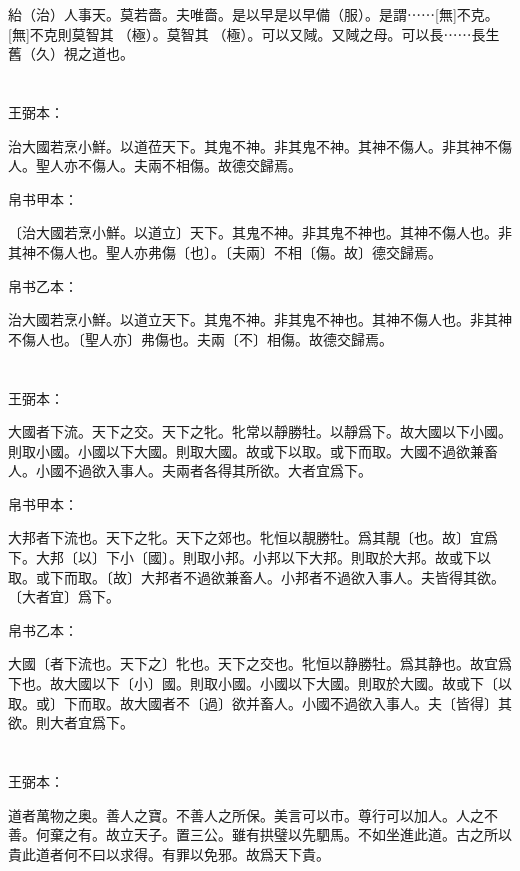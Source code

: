 \documentclass[a5paper]{ctexbook}
\begin{document}
    紿（治）人事天。莫若嗇。夫唯嗇。是以早是以早備（服）。是謂⋯⋯[無]不克。[無]不克則莫智其𠄨（極）。莫智其𠄨（極）。可以又䧕。又䧕之母。可以長⋯⋯長生舊（久）視之道也。

    \chapter{}
    王弼本：

    治大國若烹小鮮。以道莅天下。其鬼不神。非其鬼不神。其神不傷人。非其神不傷人。聖人亦不傷人。夫兩不相傷。故德交歸焉。

    
    帛书甲本：

    〔治大國若烹小鮮。以道立〕天下。其鬼不神。非其鬼不神也。其神不傷人也。非其神不傷人也。聖人亦弗傷〔也〕。〔夫兩〕不相〔傷。故〕德交歸焉。

    帛书乙本：

    治大國若烹小鮮。以道立天下。其鬼不神。非其鬼不神也。其神不傷人也。非其神不傷人也。〔聖人亦〕弗傷也。夫兩〔不〕相傷。故德交歸焉。

    \chapter{}
    王弼本：

    大國者下流。天下之交。天下之牝。牝常以靜勝牡。以靜爲下。故大國以下小國。則取小國。小國以下大國。則取大國。故或下以取。或下而取。大國不過欲兼畜人。小國不過欲入事人。夫兩者各得其所欲。大者宜爲下。

    
    帛书甲本：

    大邦者下流也。天下之牝。天下之郊也。牝恒以靚勝牡。爲其靚〔也。故〕宜爲下。大邦〔以〕下小〔國〕。則取小邦。小邦以下大邦。則取於大邦。故或下以取。或下而取。〔故〕大邦者不過欲兼畜人。小邦者不過欲入事人。夫皆得其欲。〔大者宜〕爲下。

    帛书乙本：

    大國〔者下流也。天下之〕牝也。天下之交也。牝恒以静勝牡。爲其静也。故宜爲下也。故大國以下〔小〕國。則取小國。小國以下大國。則取於大國。故或下〔以取。或〕下而取。故大國者不〔過〕欲并畜人。小國不過欲入事人。夫〔皆得〕其欲。則大者宜爲下。

    \chapter{}
    王弼本：

    道者萬物之奥。善人之寶。不善人之所保。美言可以市。尊行可以加人。人之不善。何棄之有。故立天子。置三公。雖有拱璧以先駟馬。不如坐進此道。古之所以貴此道者何不曰以求得。有罪以免邪。故爲天下貴。
\end{document}
